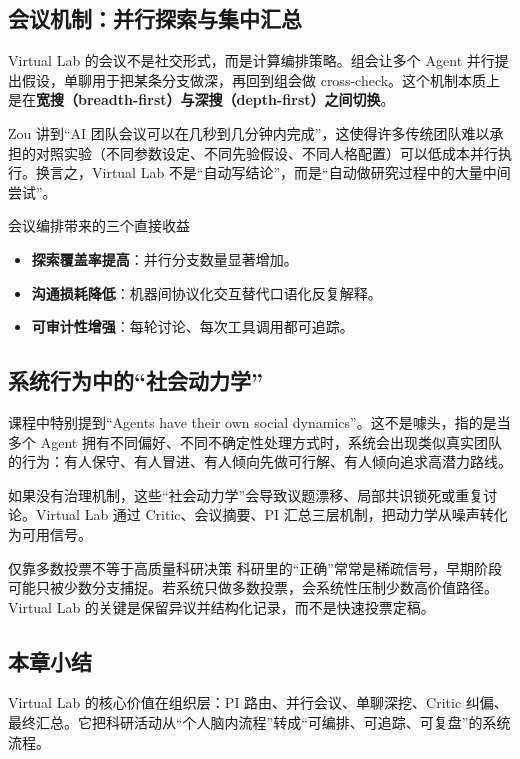 \subsection{会议机制：并行探索与集中汇总}

Virtual Lab 的会议不是社交形式，而是计算编排策略。组会让多个 Agent 并行提出假设，单聊用于把某条分支做深，再回到组会做 cross-check。这个机制本质上是在\textbf{宽搜（breadth-first）与深搜（depth-first）之间切换}。

Zou 讲到``AI 团队会议可以在几秒到几分钟内完成''，这使得许多传统团队难以承担的对照实验（不同参数设定、不同先验假设、不同人格配置）可以低成本并行执行。换言之，Virtual Lab 不是``自动写结论''，而是``自动做研究过程中的大量中间尝试''。

\begin{importantbox}{会议编排带来的三个直接收益}
\begin{itemize}
    \item \textbf{探索覆盖率提高}：并行分支数量显著增加。
    \item \textbf{沟通损耗降低}：机器间协议化交互替代口语化反复解释。
    \item \textbf{可审计性增强}：每轮讨论、每次工具调用都可追踪。
\end{itemize}
\end{importantbox}

\subsection{系统行为中的``社会动力学''}

课程中特别提到``Agents have their own social dynamics''。这不是噱头，指的是当多个 Agent 拥有不同偏好、不同不确定性处理方式时，系统会出现类似真实团队的行为：有人保守、有人冒进、有人倾向先做可行解、有人倾向追求高潜力路线。

如果没有治理机制，这些``社会动力学''会导致议题漂移、局部共识锁死或重复讨论。Virtual Lab 通过 Critic、会议摘要、PI 汇总三层机制，把动力学从噪声转化为可用信号。

\begin{warningbox}{仅靠多数投票不等于高质量科研决策}
科研里的``正确''常常是稀疏信号，早期阶段可能只被少数分支捕捉。若系统只做多数投票，会系统性压制少数高价值路径。Virtual Lab 的关键是保留异议并结构化记录，而不是快速投票定稿。
\end{warningbox}

\subsection{本章小结}

Virtual Lab 的核心价值在组织层：PI 路由、并行会议、单聊深挖、Critic 纠偏、最终汇总。它把科研活动从``个人脑内流程''转成``可编排、可追踪、可复盘''的系统流程。

